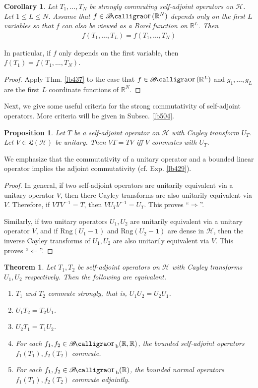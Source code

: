 \documentclass[12pt,b5paper,notitlepage]{article}
\theoremstyle{definition}
\theoremstyle{plain}
\newtheorem{thm}[df]{Theorem}
\newtheorem{pp}[df]{Proposition}
\newtheorem{co}[df]{Corollary}
\DeclareMathOperator{\Bor}{\mathscr{B}\text{\kern -2pt {\calligra\large or}}\,}
\DeclareMathOperator{\Borb}{{\mathscr{B}\text{\kern -2pt {\calligra\large or}}\,}_{\mathrm b}}
\newcommand{\fk}{\mathfrak}
\newcommand{\idt}{\mathbf{1}}
\newcommand{\Rbb}{\mathbb R}
\newcommand{\Rng}{\mathrm{Rng}}
\newcommand{\MH}{\mathcal H}
\numberwithin{equation}{section}
\begin{document}
\begin{co}\label{lb439}
Let $T_1,\dots,T_N$ be strongly commuting self-adjoint operators on $\MH$. Let $1\leq L\leq N$. Assume that $f\in\Bor(\Rbb^N)$ depends only on the first $L$ variables so that $f$ can also be viewed as a Borel function on $\Rbb^L$. Then
\begin{align*}
f(T_1,\dots,T_L)=f(T_1,\dots,T_N)
\end{align*} 
\end{co}

In particular, if $f$ only depends on the first variable, then $f(T_1)=f(T_1,\dots,T_N)$.

\begin{proof}
Apply Thm. \ref{lb437} to the case that $f\in\Bor(\Rbb^L)$ and $g_1,\dots,g_L$ are the first $L$ coordinate functions of $\Rbb^N$.
\end{proof}

Next, we give some useful criteria for the strong commutativity of self-adjoint operators. More criteria will be given in Subsec. \ref{lb504}.

\begin{pp}\label{lb438}
Let $T$ be a self-adjoint operator on $\MH$ with Cayley transform $U_T$. Let $V\in\fk L(\MH)$ be unitary. Then $VT=TV$ iff $V$ commutes with $U_T$.
\end{pp}

We emphasize that the commutativity of a unitary operator and a bounded linear operator implies the adjoint commutativity (cf. Exp. \ref{lb429}).

\begin{proof}
In general, if two self-adjoint operators are unitarily equivalent via a unitary operator $V$, then there Cayley transforms are also unitarily equivalent via $V$. Therefore, if $VTV^{-1}=T$, then $VU_TV^{-1}=U_T$. This proves ``$\Rightarrow$''.

Similarly, if two unitary operators $U_1,U_2$ are unitarily equivalent via a unitary operator $V$, and if $\Rng(U_1-\idt)$ and $\Rng(U_2-\idt)$ are dense in $\MH$, then the inverse Cayley transforms of $U_1,U_2$ are also unitarily equivalent via $V$. This proves ``$\Leftarrow$''.
\end{proof}



\begin{thm}\label{lb489}
Let $T_1,T_2$ be self-adjoint operators on $\MH$ with Cayley transforms $U_1,U_2$ respectively. Then the following are equivalent.
\begin{enumerate}[label=(\arabic*)]
\item $T_1$ and $T_2$ commute strongly, that is, $U_1U_2=U_2U_1$.
\item $U_1T_2=T_2U_1$.
\item $U_2T_1=T_1U_2$.
\item For each $f_1,f_2\in\Borb(\Rbb,\Rbb)$, the bounded self-adjoint operators $f_1(T_1),f_2(T_2)$ commute.
\item For each $f_1,f_2\in\Borb(\Rbb)$, the bounded normal operators $f_1(T_1),f_2(T_2)$ commute adjointly.
\end{enumerate}
\end{thm}
\end{document}
